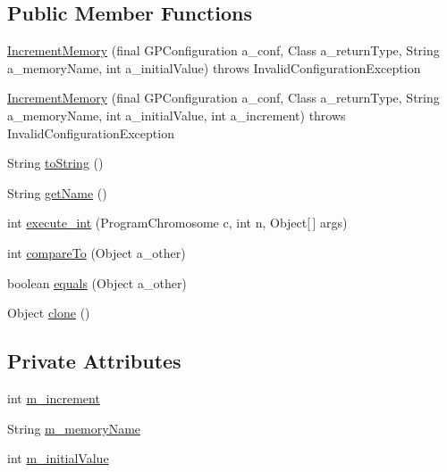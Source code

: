 \subsection*{Public Member Functions}
\begin{DoxyCompactItemize}
\item 
\hyperlink{classorg_1_1jgap_1_1gp_1_1function_1_1_increment_memory_ae43f1d4d6adb66c1f601976d32c0b59b}{Increment\-Memory} (final G\-P\-Configuration a\-\_\-conf, Class a\-\_\-return\-Type, String a\-\_\-memory\-Name, int a\-\_\-initial\-Value)  throws Invalid\-Configuration\-Exception 
\item 
\hyperlink{classorg_1_1jgap_1_1gp_1_1function_1_1_increment_memory_a90e56ba0c9658b072ecca4065629f338}{Increment\-Memory} (final G\-P\-Configuration a\-\_\-conf, Class a\-\_\-return\-Type, String a\-\_\-memory\-Name, int a\-\_\-initial\-Value, int a\-\_\-increment)  throws Invalid\-Configuration\-Exception 
\item 
String \hyperlink{classorg_1_1jgap_1_1gp_1_1function_1_1_increment_memory_a6f77df25f39eccad9239663c6d6ca7f8}{to\-String} ()
\item 
String \hyperlink{classorg_1_1jgap_1_1gp_1_1function_1_1_increment_memory_a253853664ace7db57233392f50f8cf13}{get\-Name} ()
\item 
int \hyperlink{classorg_1_1jgap_1_1gp_1_1function_1_1_increment_memory_aeebc9113f45d67a18016d86e7cf0cbd9}{execute\-\_\-int} (Program\-Chromosome c, int n, Object\mbox{[}$\,$\mbox{]} args)
\item 
int \hyperlink{classorg_1_1jgap_1_1gp_1_1function_1_1_increment_memory_a1ca8696ab5436d7ce51c4eb1b39ffa58}{compare\-To} (Object a\-\_\-other)
\item 
boolean \hyperlink{classorg_1_1jgap_1_1gp_1_1function_1_1_increment_memory_a103cf16ce2bfd11606b7f98bf2230915}{equals} (Object a\-\_\-other)
\item 
Object \hyperlink{classorg_1_1jgap_1_1gp_1_1function_1_1_increment_memory_a2072864a298e71a87d067c5837fb47a5}{clone} ()
\end{DoxyCompactItemize}
\subsection*{Private Attributes}
\begin{DoxyCompactItemize}
\item 
int \hyperlink{classorg_1_1jgap_1_1gp_1_1function_1_1_increment_memory_a37ac2b55b700656b29453321a1798cdf}{m\-\_\-increment}
\item 
String \hyperlink{classorg_1_1jgap_1_1gp_1_1function_1_1_increment_memory_af5b929df1231d94ec406c97e581ccbd3}{m\-\_\-memory\-Name}
\item 
int \hyperlink{classorg_1_1jgap_1_1gp_1_1function_1_1_increment_memory_a546ae2009d63f26cbb1e593199c0b8e8}{m\-\_\-initial\-Value}
\end{DoxyCompactItemize}
